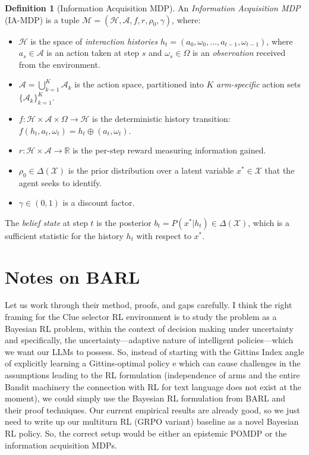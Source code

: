 \documentclass[11pt]{article}
\theoremstyle{plain}
\theoremstyle{definition}
\newtheorem{definition}[theorem]{Definition}
\theoremstyle{remark}
\begin{document}
\begin{definition}[Information Acquisition MDP]
\label{def:ia-mdp}
An \emph{Information Acquisition MDP} (IA-MDP) is a tuple
$\mathcal{M} = (\mathcal{H}, \mathcal{A}, f, r, \rho_0, \gamma)$, 
where:
\begin{itemize}
    \item $\mathcal{H}$ is the space of \emph{interaction histories}
          $h_t = (a_0, \omega_0, \ldots, a_{t-1}, \omega_{t-1})$,
          where $a_s \in \mathcal{A}$ is an action taken at step $s$
          and $\omega_s \in \Omega$ is an \emph{observation} 
          received from the environment.
    \item $\mathcal{A} = \bigcup_{k=1}^{K} \mathcal{A}_k$ is the 
          action space, partitioned into $K$ \emph{arm-specific} 
          action sets $\{\mathcal{A}_k\}_{k=1}^K$.
    \item $f: \mathcal{H} \times \mathcal{A} \times \Omega 
          \rightarrow \mathcal{H}$ is the deterministic history 
          transition: $f(h_t, a_t, \omega_t) = h_t \oplus 
          (a_t, \omega_t)$.
    \item $r: \mathcal{H} \times \mathcal{A} \rightarrow \mathbb{R}$ 
          is the per-step reward measuring information gained.
    \item $\rho_0 \in \Delta(\mathcal{X})$ is the prior distribution 
          over a latent variable $x^* \in \mathcal{X}$ that the 
          agent seeks to identify.
    \item $\gamma \in (0,1)$ is a discount factor.
\end{itemize}
The \emph{belief state} at step $t$ is the posterior 
$b_t = P(x^* | h_t) \in \Delta(\mathcal{X})$, which is a 
sufficient statistic for the history $h_t$ with respect to $x^*$.
\end{definition}

\section{Notes on BARL~\citep{zhang2025markovianreflectiveexplorationbayesadaptive}}

Let us work through their method, proofs, and gaps carefully. I think the right framing for the Clue selector RL environment is to study the problem as a Bayesian RL problem, within the context of decision making under uncertainty and specifically, the uncertainty—adaptive nature of intelligent policies—which we want our LLMs to possess. So, instead of starting with the Gittins Index angle of explicitly learning a Gittins-optimal policy e which can cause challenges in the assumptions leading to the RL formulation (independence of arms and the entire Bandit machinery the connection with RL for text language does not exist at the moment), we could simply use the Bayesian RL formulation from BARL and their proof techniques. Our current empirical results are already good, so we just need to write up our multiturn RL (GRPO variant) baseline as a novel Bayesian RL policy. So, the correct setup would be either an epistemic POMDP or the information acquisition MDPs. 
\end{document}
